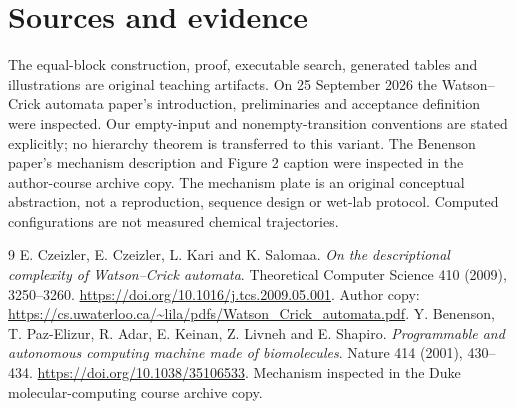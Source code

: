 \section*{Sources and evidence}
The equal-block construction, proof, executable search, generated tables and
illustrations are original teaching artifacts. On 25 September 2026 the
Watson--Crick automata paper's introduction, preliminaries and acceptance
definition were inspected. Our empty-input and nonempty-transition conventions
are stated explicitly; no hierarchy theorem is transferred to this variant.
The Benenson paper's mechanism description and Figure 2 caption were inspected
in the author-course archive copy. The mechanism plate is an original
conceptual abstraction, not a reproduction, sequence design or wet-lab protocol.
Computed configurations are not measured chemical trajectories.
\begingroup\let\chapter\section
\begin{thebibliography}{9}
 E. Czeizler, E. Czeizler, L. Kari and K. Salomaa.
\emph{On the descriptional complexity of Watson--Crick automata}.
Theoretical Computer Science 410 (2009), 3250--3260.
\url{https://doi.org/10.1016/j.tcs.2009.05.001}.
Author copy: \url{https://cs.uwaterloo.ca/~lila/pdfs/Watson_Crick_automata.pdf}.
 Y. Benenson, T. Paz-Elizur, R. Adar, E. Keinan,
Z. Livneh and E. Shapiro.
\emph{Programmable and autonomous computing machine made of biomolecules}.
Nature 414 (2001), 430--434.
\url{https://doi.org/10.1038/35106533}.
Mechanism inspected in the Duke molecular-computing course archive copy.
\end{thebibliography}\endgroup
